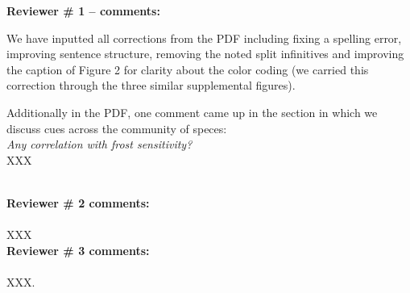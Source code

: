 \documentclass[11pt,a4paper]{article}
\begin{document}


{\bf Reviewer \# 1 -- comments:} \\

\begin{quote}

\end{quote}

We have inputted all corrections from the PDF including fixing a spelling error, improving sentence structure, removing the noted split infinitives and improving the caption of Figure 2 for clarity about the color coding (we carried this correction through the three similar supplemental figures). 

Additionally in the PDF, one comment came up in the section in which we discuss cues across the community of speces:\\
\emph{Any correlation with frost sensitivity?}\\

XXX

\\
{\bf Reviewer \# 2 comments:} \\

\emph{}\\

XXX \\


{\bf Reviewer \# 3 comments:} \\


\emph{}\\

XXX. \\

\newpage

\end{document}
